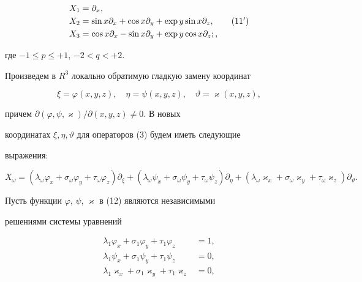 \begin{thmnonum}
\begin{align}
% 


X_1&=\partial_x,\notag \\


X_2&=\sin x\partial_x+\cos x\partial_y+ 


\exp y\sin x\partial_z,\tag{11${}'$}\\ 


% 


X_3&=\cos x\partial_x-\sin x\partial_y+ 


\exp y\cos x\partial_z;\notag, 


\end{align} 


где $-1\le p\le +1$, $-2<q<+2$. 


\end{thmnonum} 


 


Произведем в $R^3$ локально обратимую гладкую замену координат 


\begin{equation} 


\xi=\varphi(x,y,z),\quad \eta=\psi(x,y,z),\quad 


\vartheta=\varkappa(x,y,z), 


\end{equation} 


причем $\partial(\varphi,\psi,\varkappa)/\partial(x,y,z)\ne 0$. В новых 


координатах $\xi,\eta,\vartheta$ для операторов (3) будем иметь следующие 


выражения: 


\begin{equation} 


X_\omega=(\lambda_\omega\varphi_x+\sigma_\omega\varphi_y+ 


\tau_\omega\varphi_z)\partial_\xi+ 


(\lambda_\omega\psi_x+\sigma_\omega\psi_y+\tau_\omega\psi_z) 


\partial_\eta+(\lambda_\omega\varkappa_x+\sigma_\omega\varkappa_y+ 


\tau_\omega\varkappa_z)\partial_\vartheta. 


\end{equation} 


Пусть функции $\varphi$, $\psi$, $\varkappa$ в (12) являются независимыми 


решениями системы уравнений 


\begin{equation} 


\begin{split} 


\lambda_1\varphi_x+\sigma_1\varphi_y+\tau_1\varphi_z&=1,\\ 


\lambda_1\psi_x+\sigma_1\psi_y+\tau_1\psi_z&=0,\\ 


\lambda_1\varkappa_x+\sigma_1\varkappa_y+\tau_1\varkappa_z&=0, 


\end{split} 


\end{equation} 


